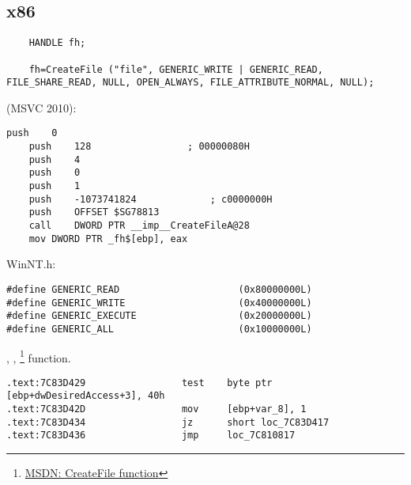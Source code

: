 \subsection{x86}


\begin{lstlisting}
	HANDLE fh;

	fh=CreateFile ("file", GENERIC_WRITE | GENERIC_READ, FILE_SHARE_READ, NULL, OPEN_ALWAYS, FILE_ATTRIBUTE_NORMAL, NULL);
\end{lstlisting}

 (MSVC 2010):

\begin{lstlisting}[caption=MSVC 2010]
	push	0
	push	128					; 00000080H
	push	4
	push	0
	push	1
	push	-1073741824				; c0000000H
	push	OFFSET $SG78813
	call	DWORD PTR __imp__CreateFileA@28
	mov	DWORD PTR _fh$[ebp], eax
\end{lstlisting}

 WinNT.h:

\begin{lstlisting}[caption=WinNT.h]
#define GENERIC_READ                     (0x80000000L)
#define GENERIC_WRITE                    (0x40000000L)
#define GENERIC_EXECUTE                  (0x20000000L)
#define GENERIC_ALL                      (0x10000000L)
\end{lstlisting}

, 
, 
 \footnote{\href{http://msdn.microsoft.com/en-us/library/aa363858(VS.85).aspx}{MSDN: CreateFile function}} function.



\begin{lstlisting}[caption=KERNEL32.DLL (Windows XP SP3 x86)]
.text:7C83D429                 test    byte ptr [ebp+dwDesiredAccess+3], 40h
.text:7C83D42D                 mov     [ebp+var_8], 1
.text:7C83D434                 jz      short loc_7C83D417
.text:7C83D436                 jmp     loc_7C810817
\end{lstlisting}

